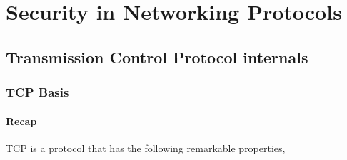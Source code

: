 \documentclass[10pt]{\classname}
\begin{document}
%

\part{Security in Networking Protocols}

\chapter{Transmission Control Protocol internals}

\section{TCP Basis}

\subsection{Recap}

TCP is a protocol that has the following remarkable properties,
\end{document}
